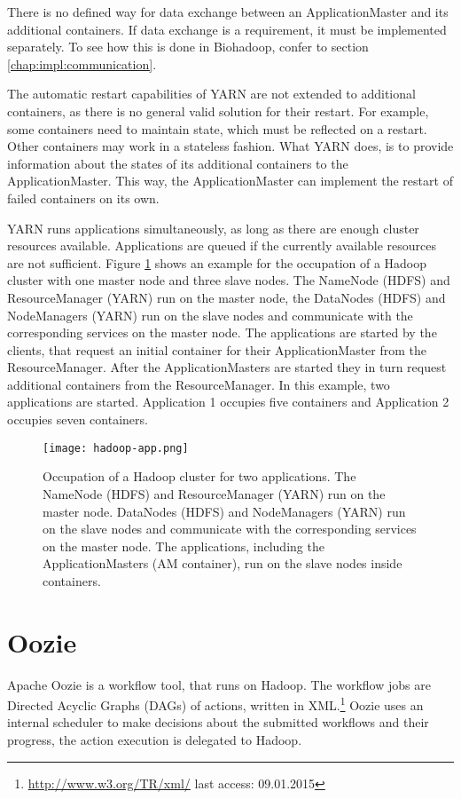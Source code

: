 There is no defined way for data exchange between an ApplicationMaster and its additional containers. If data exchange is a requirement, it must be implemented separately. To see how this is done in Biohadoop, confer to section \ref{chap:impl:communication}.

The automatic restart capabilities of YARN are not extended to additional containers, as there is no general valid solution for their restart. For example, some containers need to maintain state, which must be reflected on a restart. Other containers may work in a stateless fashion. What YARN does, is to provide information about the states of its additional containers to the ApplicationMaster. This way, the ApplicationMaster can implement the restart of failed containers on its own.

YARN runs applications simultaneously, as long as there are enough cluster resources available. Applications are queued if the currently available resources are not sufficient. Figure \ref{fig:hadoop-app} shows an example for the occupation of a Hadoop cluster with one master node and three slave nodes. The NameNode (HDFS) and ResourceManager (YARN) run on the master node, the DataNodes (HDFS) and NodeManagers (YARN) run on the slave nodes and communicate with the corresponding services on the master node. The applications are started by the clients, that request an initial container for their ApplicationMaster from the ResourceManager. After the ApplicationMasters are started they in turn request additional containers from the ResourceManager. In this example, two applications are started. Application 1 occupies five containers and Application 2 occupies seven containers.

\begin{figure}
  \centering
  \texttt{[image: hadoop-app.png]}
  \caption[Occupation of a Hadoop cluster for two applications]{Occupation of a Hadoop cluster for two applications. The NameNode (HDFS) and ResourceManager (YARN) run on the master node. DataNodes (HDFS) and NodeManagers (YARN) run on the slave nodes and communicate with the corresponding services on the master node. The applications, including the ApplicationMasters (AM container), run on the slave nodes inside containers.}
  \label{fig:hadoop-app}
\end{figure}

\section{Oozie}
\label{chap:hadoop:oozie}
Apache Oozie is a workflow tool, that runs on Hadoop. The workflow jobs are Directed Acyclic Graphs (DAGs) of actions, written in XML.\footnote{\url{http://www.w3.org/TR/xml/} last access: 09.01.2015} Oozie uses an internal scheduler to make decisions about the submitted workflows and their progress, the action execution is delegated to Hadoop.

